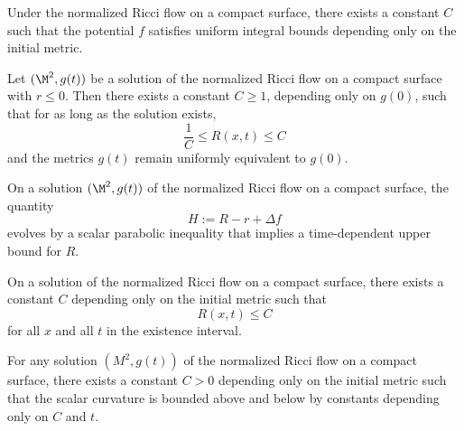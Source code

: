 \begin{corollary}
\label{ch05-cor-potential-time-evolution}

Under the normalized Ricci flow on a compact surface, there exists a constant \(C\) such that the potential \(f\) satisfies uniform integral bounds depending only on the initial metric.
\end{corollary}

\begin{proposition}
\label{ch05-prop-curvature-bounds-nonpositive-average}

Let \((\M^2,g(t))\) be a solution of the normalized Ricci flow on a compact surface with \(r\le 0\). Then there exists a constant \(C\ge 1\), depending only on \(g(0)\), such that for as long as the solution exists,
\[
\frac1C \le R(x,t)\le C
\]
and the metrics \(g(t)\) remain uniformly equivalent to \(g(0)\).
\end{proposition}

\begin{proposition}[Evolution of \(H\)]
\label{ch05-prop-H-evolution}

On a solution \((\M^2,g(t))\) of the normalized Ricci flow on a compact surface, the quantity
\[
H:=R-r+\Delta f
\]
evolves by a scalar parabolic inequality that implies a time-dependent upper bound for \(R\).
\end{proposition}

\begin{corollary}
\label{ch05-cor-upper-curvature-control}

On a solution of the normalized Ricci flow on a compact surface, there exists a constant \(C\) depending only on the initial metric such that
\[
R(x,t)\le C
\]
for all \(x\) and all \(t\) in the existence interval.
\end{corollary}

\begin{proposition}
\label{ch05-prop-two-sided-curvature-control}

For any solution \((M^2,g(t))\) of the normalized Ricci flow on a compact surface, there exists a constant \(C>0\) depending only on the initial metric such that the scalar curvature is bounded above and below by constants depending only on \(C\) and \(t\).
\end{proposition}

